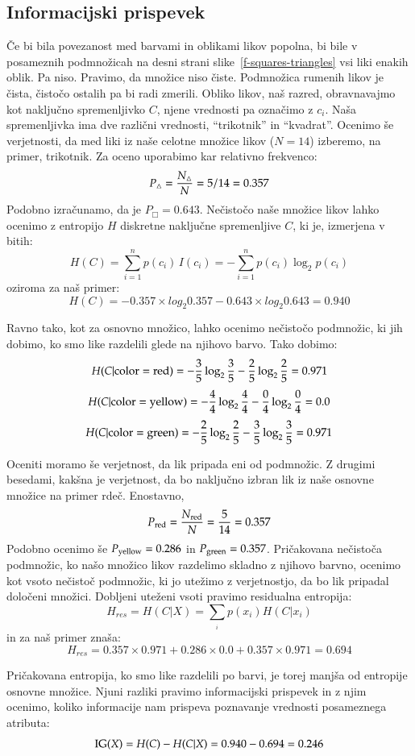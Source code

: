 \subsection{Informacijski prispevek}

Če bi bila povezanost med barvami in oblikami likov popolna, bi bile v posameznih podmnožicah na desni strani slike~\ref{f-squares-triangles} vsi liki enakih oblik. Pa niso. Pravimo, da množice niso čiste. Podmnožica rumenih likov je čista, čistočo ostalih pa bi radi zmerili. Obliko likov, naš razred, obravnavajmo kot naključno spremenljivko $C$, njene vrednosti pa označimo z $c_i$. Naša spremenljivka ima dve različni vrednosti, ``trikotnik'' in ``kvadrat''. Ocenimo še verjetnosti, da med liki iz naše celotne množice likov ($N=14$) izberemo, na primer, trikotnik. Za oceno uporabimo kar relativno frekvenco:
%
$$ P_{\triangle}={N_{\triangle} \over N} = 5/14 = 0.357 $$
%
Podobno izračunamo, da je $P_{\Box}= 0.643$. Nečistočo naše množice likov lahko ocenimo z entropijo $H$ diskretne naključne spremenljive $C$, ki je, izmerjena v bitih:
%
$$ H(C) = \sum_{i=1}^n {p(c_i)\,I(c_i)} = -\sum_{i=1}^n {p(c_i) \log_2 p(c_i)} $$
%
oziroma za naš primer:
$$ H(C) = - 0.357 \times log_2 0.357 - 0.643 \times log_2 0.643 = 0.940 $$

Ravno tako, kot za osnovno množico, lahko ocenimo nečistočo podmnožic, ki jih dobimo, ko smo like razdelili glede na njihovo barvo. Tako dobimo:
%
$$ H(C|{\rm color=red}) = -{3\over 5}\log_2{3\over 5}-{2\over 5}\log_2{2\over 5}=0.971 $$
$$ H(C|{\rm color=yellow}) = -{4\over 4}\log_2{4\over 4}-{0\over 4}\log_2{0\over 4}=0.0 $$
$$ H(C|{\rm color=green}) = -{2\over 5}\log_2{2\over 5}-{3\over 5}\log_2{3\over 5}=0.971 $$

Oceniti moramo še verjetnost, da lik pripada eni od podmnožic. Z drugimi besedami, kakšna je verjetnost, da bo naključno izbran lik iz naše osnovne množice na primer rdeč. Enostavno, 
%
$$ P_{\rm red}={N_{\rm red}\over N} = {5\over 14}=0.357$$
%
Podobno ocenimo še $P_{\rm yellow}=0.286$ in $P_{\rm green}=0.357$. Pričakovana nečistoča podmnožic, ko našo množico likov razdelimo skladno z njihovo barvno, ocenimo kot vsoto nečistoč podmnožic, ki jo utežimo z verjetnostjo, da bo lik pripadal določeni množici. Dobljeni uteženi vsoti pravimo residualna entropija:
%
$$ H_{res}=H(C|X)=\sum_{_i} p(x_i) H(C|x_i)  $$
%
in za naš primer znaša:
$$ H_{res} = 0.357 \times 0.971 + 0.286 \times 0.0 + 0.357 \times 0.971 = 0.694 $$

Pričakovana entropija, ko smo like razdelili po barvi, je torej manjša od entropije osnovne množice. Njuni razliki pravimo informacijski prispevek  in z njim ocenimo, koliko informacije nam prispeva poznavanje vrednosti posameznega atributa:
$$ {\rm IG}(X) = H(C) - H(C|X) = 0.940 - 0.694 = 0.246 $$

